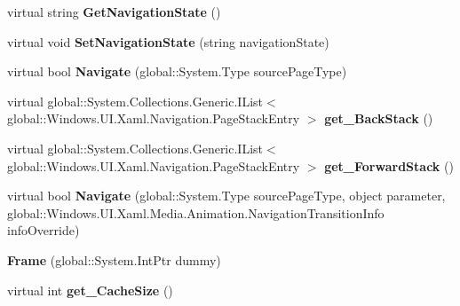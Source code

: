 \begin{DoxyCompactItemize}
virtual string {\bfseries Get\+Navigation\+State} ()
\item 
\mbox{\label{class_windows_1_1_u_i_1_1_xaml_1_1_controls_1_1_frame_ad11b0d06a73306aa6bdb716ba217bf42}} 
virtual void {\bfseries Set\+Navigation\+State} (string navigation\+State)
\item 
\mbox{\label{class_windows_1_1_u_i_1_1_xaml_1_1_controls_1_1_frame_a1ba0f46855026734880083781db1286b}} 
virtual bool {\bfseries Navigate} (global\+::\+System.\+Type source\+Page\+Type)
\item 
\mbox{\label{class_windows_1_1_u_i_1_1_xaml_1_1_controls_1_1_frame_a80ca191b072efed7111ea58c25416f2e}} 
virtual global\+::\+System.\+Collections.\+Generic.\+I\+List$<$ global\+::\+Windows.\+U\+I.\+Xaml.\+Navigation.\+Page\+Stack\+Entry $>$ {\bfseries get\+\_\+\+Back\+Stack} ()
\item 
\mbox{\label{class_windows_1_1_u_i_1_1_xaml_1_1_controls_1_1_frame_ae329d75ad7803db9b56a1087833db051}} 
virtual global\+::\+System.\+Collections.\+Generic.\+I\+List$<$ global\+::\+Windows.\+U\+I.\+Xaml.\+Navigation.\+Page\+Stack\+Entry $>$ {\bfseries get\+\_\+\+Forward\+Stack} ()
\item 
\mbox{\label{class_windows_1_1_u_i_1_1_xaml_1_1_controls_1_1_frame_ad618ba9d883d20cb4fe2b759803359e9}} 
virtual bool {\bfseries Navigate} (global\+::\+System.\+Type source\+Page\+Type, object parameter, global\+::\+Windows.\+U\+I.\+Xaml.\+Media.\+Animation.\+Navigation\+Transition\+Info info\+Override)
\item 
\mbox{\label{class_windows_1_1_u_i_1_1_xaml_1_1_controls_1_1_frame_a84fab9df3b200274d2539149011dfb10}} 
{\bfseries Frame} (global\+::\+System.\+Int\+Ptr dummy)
\item 
\mbox{\label{class_windows_1_1_u_i_1_1_xaml_1_1_controls_1_1_frame_a4feacaac243c53e320ffcf6ceba4a5e7}} 
virtual int {\bfseries get\+\_\+\+Cache\+Size} ()

\end{DoxyCompactItemize}
